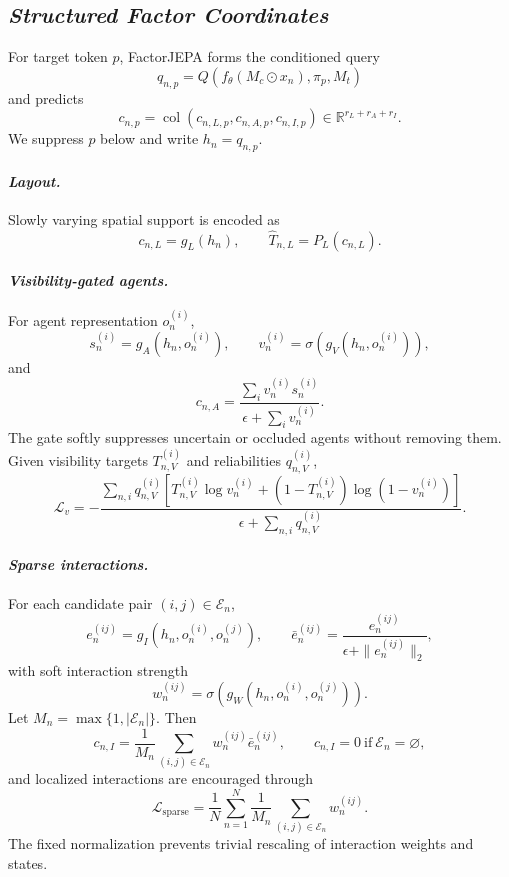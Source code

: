 \subsection{\textbf{\emph{Structured Factor Coordinates}}}

For target token $p$, FactorJEPA forms the conditioned query
\[
q_{n,p}=Q\!\left(f_\theta(M_c\odot x_n),\pi_p,M_t\right)
\]
and predicts
\[
c_{n,p}
=
\operatorname{col}
\!\left(c_{n,L,p},c_{n,A,p},c_{n,I,p}\right)
\in\mathbb R^{r_L+r_A+r_I}.
\]
We suppress $p$ below and write $h_n=q_{n,p}$.

\paragraph{\textbf{\emph{Layout.}}}
Slowly varying spatial support is encoded as
\[
c_{n,L}=g_L(h_n),
\qquad
\widehat T_{n,L}=P_L(c_{n,L}).
\]

\paragraph{\textbf{\emph{Visibility-gated agents.}}}
For agent representation $o_n^{(i)}$,
\[
s_n^{(i)}=g_A(h_n,o_n^{(i)}),
\qquad
v_n^{(i)}=\sigma\!\left(g_V(h_n,o_n^{(i)})\right),
\]
and
\[
c_{n,A}
=
\frac{\sum_i v_n^{(i)}s_n^{(i)}}
{\epsilon+\sum_i v_n^{(i)}}.
\]
The gate softly suppresses uncertain or occluded agents without removing them.
Given visibility targets $T_{n,V}^{(i)}$ and reliabilities $q_{n,V}^{(i)}$,
\[
\mathcal L_v
=
-
\frac{
\sum_{n,i}q_{n,V}^{(i)}
\left[
T_{n,V}^{(i)}\log v_n^{(i)}
+
(1-T_{n,V}^{(i)})\log(1-v_n^{(i)})
\right]
}{
\epsilon+\sum_{n,i}q_{n,V}^{(i)}
}.
\]

\paragraph{\textbf{\emph{Sparse interactions.}}}
For each candidate pair $(i,j)\in\mathcal E_n$,
\[
e_n^{(ij)}
=
g_I(h_n,o_n^{(i)},o_n^{(j)}),
\qquad
\bar e_n^{(ij)}
=
\frac{e_n^{(ij)}}{\epsilon+\|e_n^{(ij)}\|_2},
\]
with soft interaction strength
\[
w_n^{(ij)}
=
\sigma\!\left(g_W(h_n,o_n^{(i)},o_n^{(j)})\right).
\]
Let $M_n=\max\{1,|\mathcal E_n|\}$. Then
\[
c_{n,I}
=
\frac{1}{M_n}
\sum_{(i,j)\in\mathcal E_n}
w_n^{(ij)}\bar e_n^{(ij)},
\qquad
c_{n,I}=0
\ \text{if}\ 
\mathcal E_n=\varnothing,
\]
and localized interactions are encouraged through
\[
\mathcal L_{\mathrm{sparse}}
=
\frac{1}{N}
\sum_{n=1}^{N}
\frac{1}{M_n}
\sum_{(i,j)\in\mathcal E_n}
w_n^{(ij)}.
\]
The fixed normalization prevents trivial rescaling of interaction weights and
states.















